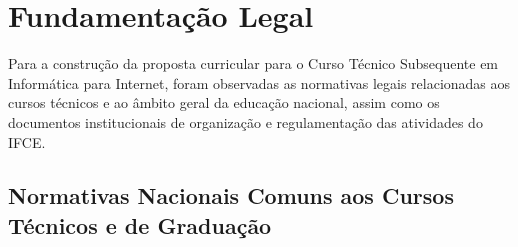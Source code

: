 \documentclass[
	12pt,				%
	openright,			%
	twoside,			%
	a4paper,			%
	chapter=TITLE,		%
	english,			%
	french,				%
	spanish,			%
	brazil,				%
	]{abntex2}
\begin{document}
\textual


\normalsize


	

\chapter{Fundamentação Legal}
Para a construção da proposta curricular para o Curso Técnico Subsequente em Informática para Internet, foram observadas as normativas legais relacionadas aos cursos técnicos e ao âmbito geral da educação nacional, assim como os documentos institucionais de organização e regulamentação das atividades do IFCE.

\section{Normativas Nacionais Comuns aos Cursos Técnicos e de Graduação}
\end{document}

